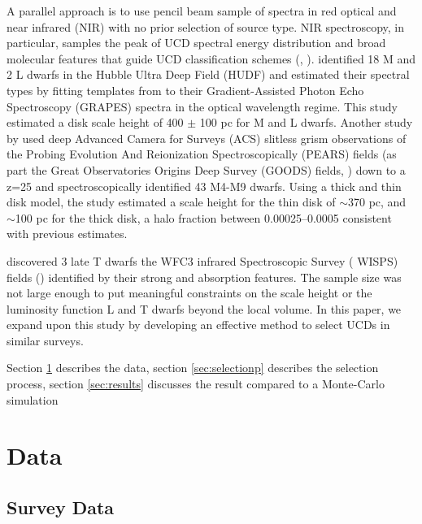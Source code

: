 \documentclass[manuscript]{aastex}
\begin{document}
A parallel approach is to use pencil beam sample of spectra in red optical and near infrared (NIR) with no prior selection of source type. NIR spectroscopy, in particular, samples the peak of UCD spectral energy distribution and broad molecular features that guide UCD classification schemes (\citealt{2005ARA&A..43..195K}, \citealt{2006ApJ...637.1067B}). \citet{2005ApJ...622..319P} identified 18 M and 2 L dwarfs in the Hubble Ultra Deep Field (HUDF) and estimated their spectral types by fitting templates from \citet{Kirkpatrick2000} to their Gradient-Assisted Photon Echo Spectroscopy (GRAPES) spectra in the optical wavelength regime. This study estimated a disk scale height of 400 $\pm$ 100 pc for M and L dwarfs. Another study by \citet{2009ApJ...695.1591P} used deep Advanced Camera for Surveys (ACS) slitless grism observations of the Probing Evolution And Reionization Spectroscopically (PEARS) fields (as part the Great Observatories Origins Deep Survey (GOODS) fields, \citealt{Giavalisco2004}) down to a z=25 and spectroscopically identified 43 M4-M9 dwarfs. Using a thick and thin disk model, the study estimated a scale height for the thin disk of $\sim$370 pc, and $\sim$100 pc for the thick disk, a halo fraction between 0.00025--0.0005 consistent with previous estimates. 

\citealt{2012ApJ...752L..14M} discovered 3 late T dwarfs the WFC3 infrared Spectroscopic Survey ( WISPS) fields (\citealt{2010ApJ...723..104A}) identified by their strong \meth and \wat absorption features. The sample size was not large enough to put meaningful constraints on the scale height or the luminosity function L and T dwarfs beyond the local volume. In this paper, we expand upon this study by developing an effective method to select UCDs in similar surveys.

Section \ref{sec:data} describes the data, section \ref{sec:selectionp} describes the selection process, section \ref{sec:results} discusses the result compared to a Monte-Carlo simulation

\section{Data}\label{sec:data}
\subsection{Survey Data}
\end{document}
